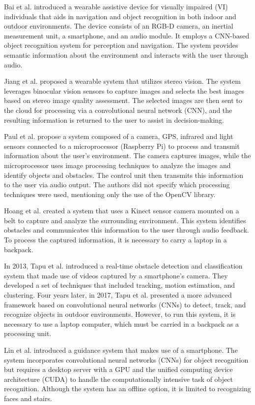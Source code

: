 \documentclass[final,5p,times,twocolumn]{elsarticle}
\begin{document}
Bai et al. \cite{bai2019} introduced a wearable assistive device for visually impaired (VI) individuals that aids in navigation and object recognition in both indoor and outdoor environments. The device consists of an RGB-D camera, an inertial measurement unit, a smartphone, and an audio module. It employs a CNN-based object recognition system for perception and navigation. The system provides semantic information about the environment and interacts with the user through audio.

Jiang et al. \cite{jiang2019} proposed a wearable system that utilizes stereo vision. The system leverages binocular vision sensors to capture images and selects the best images based on stereo image quality assessment. The selected images are then sent to the cloud for processing via a convolutional neural network (CNN), and the resulting information is returned to the user to assist in decision-making.

Paul et al. \cite{joe2019} propose a system composed of a camera, GPS, infrared and light sensors connected to a microprocessor (Raspberry Pi) to process and transmit information about the user's environment. The camera captures images, while the microprocessor uses image processing techniques to analyze the images and identify objects and obstacles. The control unit then transmits this information to the user via audio output. The authors did not specify which processing techniques were used, mentioning only the use of the OpenCV library.

Hoang et al. \cite{hoang2017} created a system that uses a Kinect sensor camera mounted on a belt to capture and analyze the surrounding environment. This system identifies obstacles and communicates this information to the user through audio feedback. To process the captured information, it is necessary to carry a laptop in a backpack.

In 2013, Tapu et al. \cite{tapu2013} introduced a real-time obstacle detection and classification system that made use of videos captured by a smartphone's camera. They developed a set of techniques that included tracking, motion estimation, and clustering. Four years later, in 2017, Tapu et al. \cite{tapu2017} presented a more advanced framework based on convolutional neural networks (CNNs) to detect, track, and recognize objects in outdoor environments. However, to run this system, it is necessary to use a laptop computer, which must be carried in a backpack as a processing unit.

Lin et al. \cite{lin2017} introduced a guidance system that makes use of a smartphone. The system incorporates convolutional neural networks (CNNs) for object recognition but requires a desktop server with a GPU and the unified computing device architecture (CUDA) to handle the computationally intensive task of object recognition. Although the system has an offline option, it is limited to recognizing faces and stairs.
\end{document}
